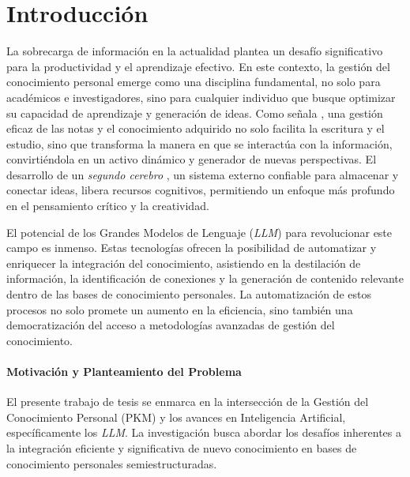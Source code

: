 
\chapter*{Introducción}

La sobrecarga de información en la actualidad plantea un desafío significativo para la productividad y el aprendizaje efectivo. En este contexto, la gestión del conocimiento personal emerge como una disciplina fundamental, no solo para académicos e investigadores, sino para cualquier individuo que busque optimizar su capacidad de aprendizaje y generación de ideas. Como señala \cite{ahrensHowTakeSmart2017}, una gestión eficaz de las notas y el conocimiento adquirido no solo facilita la escritura y el estudio, sino que transforma la manera en que se interactúa con la información, convirtiéndola en un activo dinámico y generador de nuevas perspectivas. El desarrollo de un \textit{segundo cerebro} \parencite{forteBuildingSecondBrain2022}, un sistema externo confiable para almacenar y conectar ideas, libera recursos cognitivos, permitiendo un enfoque más profundo en el pensamiento crítico y la creatividad.

El potencial de los Grandes Modelos de Lenguaje (\textit{LLM}) para revolucionar este campo es inmenso. Estas tecnologías ofrecen la posibilidad de automatizar y enriquecer la integración del conocimiento, asistiendo en la destilación de información, la identificación de conexiones y la generación de contenido relevante dentro de las bases de conocimiento personales. La automatización de estos procesos no solo promete un aumento en la eficiencia, sino también una democratización del acceso a metodologías avanzadas de gestión del conocimiento.

\subsubsection{Motivación y Planteamiento del Problema}
\label{sec:motivacion_problema}
El presente trabajo de tesis se enmarca en la intersección de la Gestión del Conocimiento Personal (PKM) y los avances en Inteligencia Artificial, específicamente los \textit{LLM}. La investigación busca abordar los desafíos inherentes a la integración eficiente y significativa de nuevo conocimiento en bases de conocimiento personales semiestructuradas.

